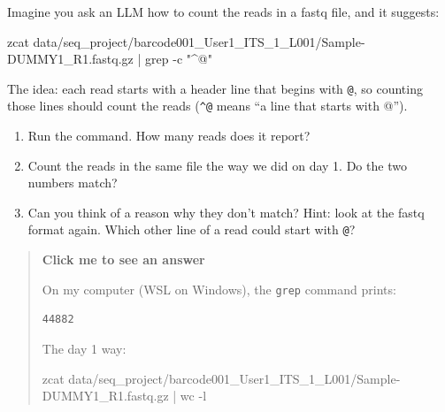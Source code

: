 \documentclass[
  letterpaper,
  DIV=11,
  numbers=noendperiod]{scrreprt}
\newenvironment{Shaded}{}{}
\newcommand{\AttributeTok}[1]{\textcolor[rgb]{0.84,0.23,0.29}{#1}}
\newcommand{\FunctionTok}[1]{\textcolor[rgb]{0.44,0.26,0.76}{#1}}
\newcommand{\KeywordTok}[1]{\textcolor[rgb]{0.84,0.23,0.29}{#1}}
\newcommand{\NormalTok}[1]{\textcolor[rgb]{0.14,0.16,0.18}{#1}}
\newcommand{\StringTok}[1]{\textcolor[rgb]{0.01,0.18,0.38}{#1}}
\providecommand{\tightlist}{%
  \setlength{\itemsep}{0pt}\setlength{\parskip}{0pt}}
\begin{document}
\begin{tcolorbox}[enhanced jigsaw, title=\textcolor{quarto-callout-color}{\faInfo}\hspace{0.5em}{Exercise}, rightrule=.15mm, titlerule=0mm, colframe=quarto-callout-color-frame, toprule=.15mm, leftrule=.75mm, colbacktitle=quarto-callout-color!10!white, bottomtitle=1mm, toptitle=1mm, arc=.35mm, opacitybacktitle=0.6, left=2mm, bottomrule=.15mm, breakable, opacityback=0, colback=white, coltitle=black]

Imagine you ask an LLM how to count the reads in a fastq file, and it
suggests:

\begin{Shaded}
\begin{Highlighting}[]
\FunctionTok{zcat}\NormalTok{ data/seq\_project/barcode001\_User1\_ITS\_1\_L001/Sample{-}DUMMY1\_R1.fastq.gz }\KeywordTok{|} \FunctionTok{grep} \AttributeTok{{-}c} \StringTok{"\^{}@"}
\end{Highlighting}
\end{Shaded}

The idea: each read starts with a header line that begins with
\texttt{@}, so counting those lines should count the reads
(\texttt{\^{}@} means ``a line that starts with @'').

\begin{enumerate}
\def\labelenumi{\arabic{enumi}.}
\tightlist
\item
  Run the command. How many reads does it report?
\item
  Count the reads in the same file the way we did on day 1. Do the two
  numbers match?
\item
  Can you think of a reason why they don't match? Hint: look at the
  fastq format again. Which other line of a read could start with
  \texttt{@}?
\end{enumerate}

\begin{quote}
\textbf{Click me to see an answer}

On my computer (WSL on Windows), the \texttt{grep} command prints:

\begin{verbatim}
44882
\end{verbatim}

The day 1 way:

\begin{Shaded}
\begin{Highlighting}[]
\FunctionTok{zcat}\NormalTok{ data/seq\_project/barcode001\_User1\_ITS\_1\_L001/Sample{-}DUMMY1\_R1.fastq.gz }\KeywordTok{|} \FunctionTok{wc} \AttributeTok{{-}l}
\end{Highlighting}
\end{Shaded}


\end{quote}
\end{tcolorbox}
\end{document}
